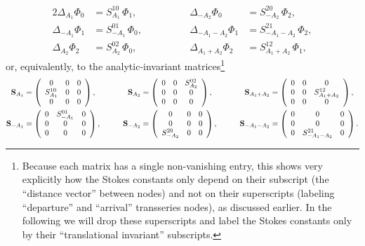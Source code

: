 \documentclass[11pt,a4paper]{article}
\begin{document}
%
\begin{alignat}{2}
\Delta_{A_1} \Phi_0 &= S_{A_1}^{10}\, \Phi_1, \qquad\qquad & \Delta_{-A_2} \Phi_0 &= S_{-A_2}^{20}\, \Phi_2, \\
\Delta_{-A_1} \Phi_1 &= S_{-A_1}^{01}\, \Phi_0, \qquad\qquad & \Delta_{-A_1-A_2} \Phi_1 &= S_{-A_1-A_2}^{21}\, \Phi_2, \\
\Delta_{A_2} \Phi_2 &= S_{A_2}^{02}\, \Phi_0, \qquad\qquad & \Delta_{A_1+A_2} \Phi_2 &= S_{A_1+A_2}^{12}\, \Phi_1,
\end{alignat}
%
\noindent
or, equivalently, to the analytic-invariant matrices\footnote{Because each matrix has a single non-vanishing entry, this shows very explicitly how the Stokes constants only depend on their subscript (the ``distance vector'' between nodes) and not on their superscripts (labeling ``departure'' and ``arrival'' transseries nodes), as discussed earlier. In the following we will drop these superscripts and label the Stokes constants only by their ``translational invariant'' subscripts.}
%
\begin{alignat}{3}
\text{\textbf{S}}_{A_1} &= \left(
\begin{array}{ccc}
0 & 0 & 0 \\
S_{A_1}^{10} & 0 & 0 \\
0 & 0 & 0
\end{array}
\right),
\qquad &
\text{\textbf{S}}_{A_2} &= \left(
\begin{array}{ccc}
0 & 0 & S_{A_2}^{02} \\
0 & 0 & 0 \\
0 & 0 & 0
\end{array}
\right),
\qquad &
\text{\textbf{S}}_{A_1+A_2} &= \left(
\begin{array}{ccc}
0 & 0 & 0 \\
0 & 0 & S_{A_1+A_2}^{12} \\
0 & 0 & 0
\end{array}
\right), \\
\text{\textbf{S}}_{-A_1} &= \left(
\begin{array}{ccc}
0 & S_{-A_1}^{01} & 0 \\
0 & 0 & 0 \\
0 & 0 & 0
\end{array}
\right),
\qquad &
\text{\textbf{S}}_{-A_2} &= \left(
\begin{array}{ccc}
0 & 0 & 0 \\
0 & 0 & 0 \\
S_{-A_2}^{20} & 0 & 0
\end{array}
\right),
\qquad &
\text{\textbf{S}}_{-A_1-A_2} &= \left(
\begin{array}{ccc}
0 & 0 & 0 \\
0 & 0 & 0 \\
0 & S_{-A_1-A_2}^{21} & 0
\end{array}
\right).
\end{alignat}
\end{document}
